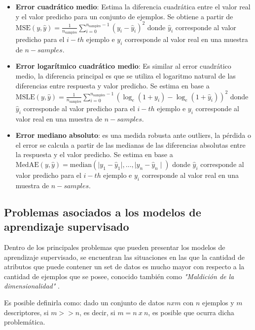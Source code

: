 \begin{itemize}
	\item \textbf{Error cuadrático medio}: Estima la diferencia cuadrática entre el valor real y el valor predicho para un conjunto de ejemplos. Se obtiene a partir de $\text{MSE}(y, \hat{y}) = \frac{1}{n_\text{samples}} \sum_{i=0}^{n_\text{samples} - 1} (y_i - \hat{y}_i)^2$ donde $\hat{y}_i$ corresponde al valor predicho para el $i-th$ ejemplo e $y_{i}$ corresponde al valor real en una muestra de $n-samples$.
		
	\item \textbf{Error logarítmico cuadrático medio}: Es similar al error cuadrático medio, la diferencia principal es que se utiliza el logaritmo natural de las diferencias entre respuesta y valor predicho. Se estima en base a $\text{MSLE}(y, \hat{y}) = \frac{1}{n_\text{samples}} \sum_{i=0}^{n_\text{samples} - 1} (\log_e (1 + y_i) - \log_e (1 + \hat{y}_i) )^2$ donde $\hat{y}_i$ corresponde al valor predicho para el $i-th$ ejemplo e $y_{i}$ corresponde al valor real en una muestra de $n-samples$.
		
	\item \textbf{Error mediano absoluto}: es una medida robusta ante outliers, la pérdida o el error se calcula a partir de las medianas de las diferencias absolutas entre la respuesta y el valor predicho. Se estima en base a $\text{MedAE}(y, \hat{y}) = \text{median}(\mid y_1 - \hat{y}_1 \mid, \ldots, \mid y_n - \hat{y}_n \mid)$ donde $\hat{y}_i$ corresponde al valor predicho para el $i-th$ ejemplo e $y_{i}$ corresponde al valor real en una muestra de $n-samples$.
		
		
\end{itemize}

\subsection{Problemas asociados a los modelos de aprendizaje supervisado \label{problemas}}

Dentro de los principales problemas que pueden presentar los modelos de aprendizaje supervisado, se encuentran las situaciones en las que la cantidad de atributos que puede contener un set de datos es mucho mayor con respecto a la cantidad de ejemplos que se posee, conocido también como \textit{"Maldición de la dimensionalidad"} \cite{indyk1998approximate}.

Es posible definirla como: dado un conjunto de datos $nxm$ con $n$ ejemplos y $m$ descriptores, si $m >> n$, es decir, si $m= n\ x\ n$, es posible que ocurra dicha problemática.

